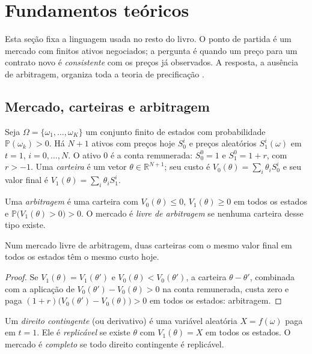 \section{Fundamentos teóricos}

Esta seção fixa a linguagem usada no resto do livro. O ponto de partida é um mercado com finitos ativos negociados; a pergunta é quando um preço para um contrato novo é \emph{consistente} com os preços já observados. A resposta, a ausência de arbitragem, organiza toda a teoria de precificação \citep{harrisonkreps1979,bjork2009}.

\subsection{Mercado, carteiras e arbitragem}

\begin{definicao}
Seja $\Omega=\{\omega_1,\dots,\omega_K\}$ um conjunto finito de estados com probabilidade $\mathbb P(\omega_k)>0$. Há $N+1$ ativos com preços hoje $S^i_0$ e preços aleatórios $S^i_1(\omega)$ em $t=1$, $i=0,\dots,N$. O ativo $0$ é a conta remunerada: $S^0_0=1$ e $S^0_1=1+r$, com $r>-1$. Uma \emph{carteira} é um vetor $\theta\in\mathbb R^{N+1}$; seu custo é $V_0(\theta)=\sum_i\theta_iS^i_0$ e seu valor final é $V_1(\theta)=\sum_i\theta_iS^i_1$.
\end{definicao}

\begin{definicao}[Arbitragem]
Uma \emph{arbitragem} é uma carteira com $V_0(\theta)\le 0$, $V_1(\theta)\ge 0$ em todos os estados e $\mathbb P\big(V_1(\theta)>0\big)>0$. O mercado é \emph{livre de arbitragem} se nenhuma carteira desse tipo existe.
\end{definicao}

\begin{proposicao}\label{prop:lpu}
Num mercado livre de arbitragem, duas carteiras com o mesmo valor final em todos os estados têm o mesmo custo hoje.
\end{proposicao}

\begin{proof}
Se $V_1(\theta)=V_1(\theta')$ e $V_0(\theta)<V_0(\theta')$, a carteira $\theta-\theta'$, combinada com a aplicação de $V_0(\theta')-V_0(\theta)>0$ na conta remunerada, custa zero e paga $(1+r)\big(V_0(\theta')-V_0(\theta)\big)>0$ em todos os estados: arbitragem.
\end{proof}

\begin{definicao}
Um \emph{direito contingente} (ou derivativo) é uma variável aleatória $X=f(\omega)$ paga em $t=1$. Ele é \emph{replicável} se existe $\theta$ com $V_1(\theta)=X$ em todos os estados. O mercado é \emph{completo} se todo direito contingente é replicável.
\end{definicao}


